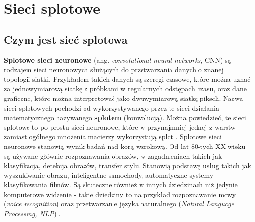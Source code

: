 \documentclass[12pt]{mwbk}
\theoremstyle{plain}
\theoremstyle{definition}
\theoremstyle{remark}
\begin{document}
\newpage
\section{Sieci splotowe}


\subsection{Czym jest sieć splotowa}

\textbf{Splotowe sieci neuronowe} (ang. \emph{convolutional neural networks}, CNN) są rodzajem sieci neuronowych służących do przetwarzania danych o znanej topologii siatki. Przykładem takich danych są szeregi czasowe, które można uznać za jednowymiarową siatkę z próbkami w regularnych odstępach czasu, oraz dane graficzne, które można interpretować jako dwuwymiarową siatkę pikseli. Nazwa sieci splotowych pochodzi od wykorzystywanego przez te sieci działania matematycznego nazywanego \textbf{splotem} (konwolucją). Można powiedzieć, że sieci splotowe to po prostu sieci neuronowe, które w przynajmniej jednej z warstw zamiast ogólnego mnożenia macierzy wykorzystują splot \cite{goodfellow}.
Splotowe sieci neuronowe stanowią wynik badań nad korą wzrokową. Od lat 80-tych XX wieku są używane głównie rozpoznawania obrazów, w zagadnieniach takich jak klasyfikacja, detekcja obrazów, transfer stylu. Stanowią podstawę usług takich jak wyszukiwanie obrazu, inteligentne samochody, automatyczne systemy klasyfikowania filmów. Są skuteczne również w innych dziedzinach niż jedynie komputerowe widzenie - takie dziedziny to na przykład rozpoznawanie mowy (\emph{voice recognition}) oraz przetwarzanie języka naturalnego (\emph{Natural Language Processing, NLP}) \cite{geron}. 

\end{document}

